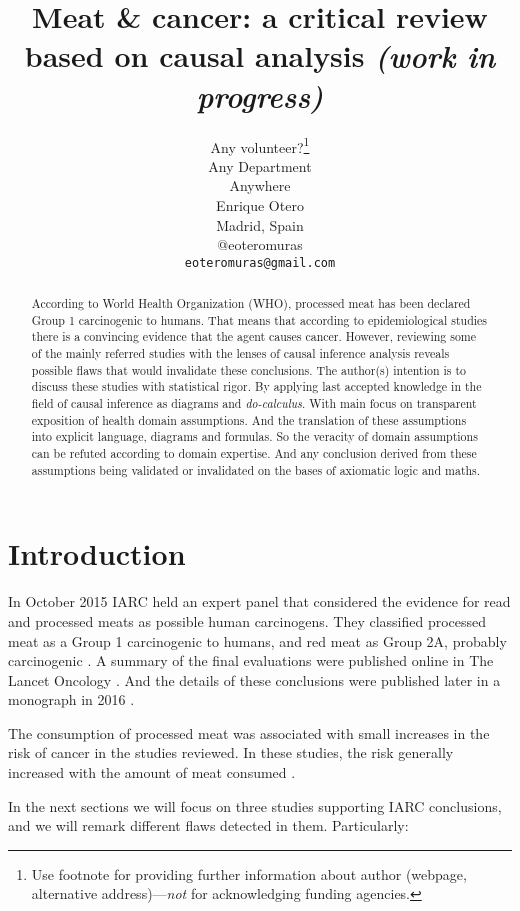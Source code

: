 \documentclass{article}
\title{Meat \& cancer: a critical review based on causal analysis \it{(work in progress)}}
\author{
  Any volunteer?\thanks{Use footnote for providing further
    information about author (webpage, alternative
    address)---\emph{not} for acknowledging funding agencies.} \\
Any Department\\
  Anywhere\\
   \And
 Enrique Otero \\
  Madrid, Spain\\
  @eoteromuras \\
  \texttt{eoteromuras@gmail.com} \\
}
\begin{document}
\maketitle

\begin{abstract}
According to World Health Organization (WHO), processed meat has been declared Group 1 carcinogenic to humans. That means that according to epidemiological studies there is a convincing evidence that the agent causes cancer. However, reviewing some of the mainly referred studies with the lenses of causal inference analysis reveals possible flaws that would invalidate these conclusions. The author(s) intention is to discuss these studies with statistical rigor. By applying last accepted knowledge in the field of causal inference as diagrams and \textit{do-calculus}. With main focus on transparent exposition of health domain assumptions. And the translation of these assumptions into explicit language, diagrams and formulas. So the veracity of domain assumptions can be refuted according to domain expertise. And any conclusion derived from these assumptions being validated or invalidated on the bases of axiomatic logic and maths.

\end{abstract}




\section{Introduction}
 In October 2015 IARC held an expert panel that considered the evidence for read and processed meats as possible human carcinogens. They classified processed meat as a Group 1 carcinogenic to humans, and red meat as Group 2A, probably carcinogenic \cite{whoint}. A summary of the final evaluations were published online in The Lancet Oncology \cite{lancet}. And the details of these conclusions were published later in a monograph in 2016 \cite{monograph}.

The consumption of processed meat was associated with small increases in the risk of cancer in the studies reviewed. In these studies, the risk generally increased with the amount of meat consumed \cite{whoint}.


In the next sections we will focus on three studies supporting IARC conclusions, and we will remark different flaws detected in them. Particularly:
\end{document}
